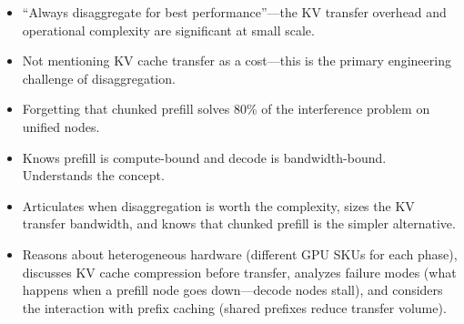 \begin{interviewq}
\redflags
\begin{itemize}
    \item ``Always disaggregate for best performance''---the KV transfer overhead and operational complexity are significant at small scale.
    \item Not mentioning KV cache transfer as a cost---this is the primary engineering challenge of disaggregation.
    \item Forgetting that chunked prefill solves 80\% of the interference problem on unified nodes.
\end{itemize}


\goodgreat
\begin{itemize}
    \item {} Knows prefill is compute-bound and decode is bandwidth-bound. Understands the concept.
    \item {} Articulates when disaggregation is worth the complexity, sizes the KV transfer bandwidth, and knows that chunked prefill is the simpler alternative.
    \item {} Reasons about heterogeneous hardware (different GPU SKUs for each phase), discusses KV cache compression before transfer, analyzes failure modes (what happens when a prefill node goes down---decode nodes stall), and considers the interaction with prefix caching (shared prefixes reduce transfer volume).
\end{itemize}

\end{interviewq}


